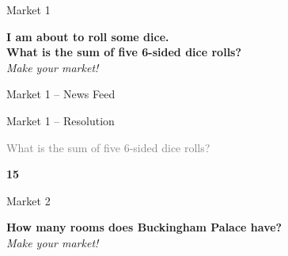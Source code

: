 
\begin{frame}{Market 1}
  \begin{sqt:result}
      \centering\large\textbf{I am about to roll some dice.}\\[4pt]
      \textbf{What is the sum of five 6-sided dice rolls?}\\[6pt]
      {\large\itshape Make your market!}
  \end{sqt:result}
\end{frame}

\begin{frame}[t]{Market 1 -- News Feed}
  \vspace{-3pt}
  \begin{feedbox}
  \end{feedbox}
\end{frame}

\begin{frame}{Market 1 -- Resolution}
  \begin{center}
    \vspace{0.3cm}
    \textcolor{gray}{\small What is the sum of five 6-sided dice rolls?}

    \vspace{0.5cm}
    \begin{tcolorbox}[
      enhanced, sharp corners,
      colback=sqt-themecolour!15, colframe=sqt-themecolour,
      left=20pt, right=20pt, top=12pt, bottom=12pt,
      boxrule=1.5pt,
    ]
      \centering\Huge\textbf{15}
    \end{tcolorbox}
  \end{center}
\end{frame}



\begin{frame}{Market 2}
  \begin{sqt:result}
      \centering\large\textbf{How many rooms does Buckingham Palace have?}\\[6pt]
      \textcolor{sqt-themecolour}{\large\itshape Make your market!}
  \end{sqt:result}
\end{frame}


